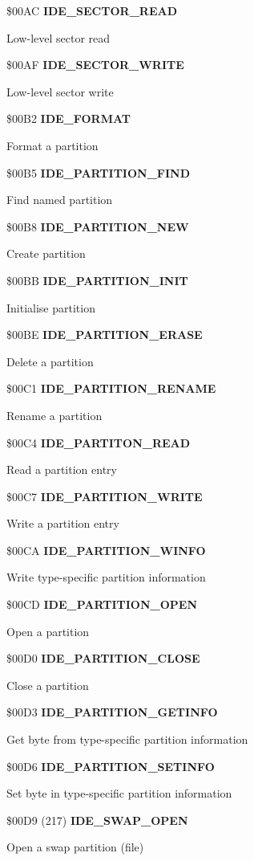 \$00AC \textbf{IDE\_SECTOR\_READ}

Low-level sector read

\$00AF \textbf{IDE\_SECTOR\_WRITE}

Low-level sector write

\$00B2 \textbf{IDE\_FORMAT}

Format a partition

\$00B5 \textbf{IDE\_PARTITION\_FIND}

Find named partition

\$00B8 \textbf{IDE\_PARTITION\_NEW}

Create partition

\$00BB \textbf{IDE\_PARTITION\_INIT}

Initialise partition

\$00BE \textbf{IDE\_PARTITION\_ERASE}

Delete a partition

\$00C1 \textbf{IDE\_PARTITION\_RENAME}

Rename a partition

\$00C4 \textbf{IDE\_PARTITON\_READ}

Read a partition entry

\$00C7 \textbf{IDE\_PARTITION\_WRITE}

Write a partition entry

\$00CA \textbf{IDE\_PARTITION\_WINFO}

Write type-specific partition information

\$00CD \textbf{IDE\_PARTITION\_OPEN}

Open a partition

\$00D0 \textbf{IDE\_PARTITION\_CLOSE}

Close a partition

\$00D3 \textbf{IDE\_PARTITION\_GETINFO}

Get byte from type-specific partition information

\$00D6 \textbf{IDE\_PARTITION\_SETINFO}

Set byte in type-specific partition information

\$00D9 (217) \textbf{IDE\_SWAP\_OPEN}

Open a swap partition (file)

